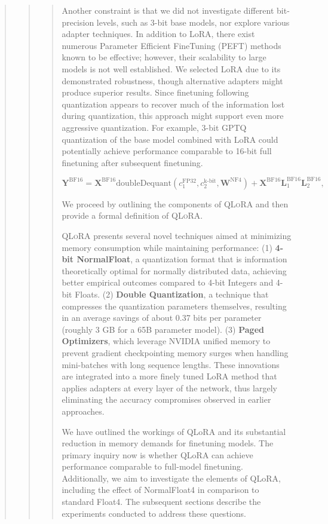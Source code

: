 \begin{quote}
\begin{quote}
\begin{quote}
Another constraint is that we did not investigate different bit-precision levels, such as 3-bit base models, nor explore various adapter techniques. In addition to LoRA, there exist numerous Parameter Efficient FineTuning (PEFT) methods known to be effective; however, their scalability to large models is not well established. We selected LoRA due to its demonstrated robustness, though alternative adapters might produce superior results. Since finetuning following quantization appears to recover much of the information lost during quantization, this approach might support even more aggressive quantization. For example, 3-bit GPTQ quantization of the base model combined with LoRA could potentially achieve performance comparable to 16-bit full finetuning after subsequent finetuning.

\begin{equation}
    \mathbf{Y}^{\text{BF16}} =  \mathbf{X}^{\text{BF16}} \text{doubleDequant}(c_1^{\text{FP32}}, c_2^{\text{k-bit}}, \mathbf{W}^{\text{NF4}}) + \mathbf{X}^{\text{BF16}}\mathbf{L}^{\text{BF16}}_1\mathbf{L}^{\text{BF16}}_2,
\end{equation}

We proceed by outlining the components of \textsc{QLoRA} and then provide a formal definition of \textsc{QLoRA}.

\textsc{QLoRA} presents several novel techniques aimed at minimizing memory consumption while maintaining performance: (1) \textbf{4-bit NormalFloat}, a quantization format that is information theoretically optimal for normally distributed data, achieving better empirical outcomes compared to 4-bit Integers and 4-bit Floats. (2) \textbf{Double Quantization}, a technique that compresses the quantization parameters themselves, resulting in an average savings of about 0.37 bits per parameter (roughly 3 GB for a 65B parameter model). (3) \textbf{Paged Optimizers}, which leverage NVIDIA unified memory to prevent gradient checkpointing memory surges when handling mini-batches with long sequence lengths. These innovations are integrated into a more finely tuned LoRA method that applies adapters at every layer of the network, thus largely eliminating the accuracy compromises observed in earlier approaches.

We have outlined the workings of QLoRA and its substantial reduction in memory demands for finetuning models. The primary inquiry now is whether QLoRA can achieve performance comparable to full-model finetuning. Additionally, we aim to investigate the elements of QLoRA, including the effect of NormalFloat4 in comparison to standard Float4. The subsequent sections describe the experiments conducted to address these questions.


\end{quote}
\end{quote}
\end{quote}

